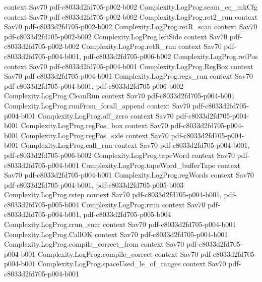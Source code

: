 \begin{theorem}
  {context}
  {Sav70}
  {pdf-c8033d2fd705-p002-b002}
\proofstep
  {Complexity.LogProg.seam_eq_mkCfg}
  {context}
  {Sav70}
  {pdf-c8033d2fd705-p002-b002}
\proofstep
  {Complexity.LogProg.ret2_run}
  {context}
  {Sav70}
  {pdf-c8033d2fd705-p002-b002}
\proofstep
  {Complexity.LogProg.retR_scan}
  {context}
  {Sav70}
  {pdf-c8033d2fd705-p002-b002}
\proofstep
  {Complexity.LogProg.leftSide}
  {context}
  {Sav70}
  {pdf-c8033d2fd705-p002-b002}
\proofstep
  {Complexity.LogProg.retR_run}
  {context}
  {Sav70}
  {pdf-c8033d2fd705-p004-b001,
    pdf-c8033d2fd705-p006-b002}
\proofstep
  {Complexity.LogProg.retPos}
  {context}
  {Sav70}
  {pdf-c8033d2fd705-p004-b001}
\proofstep
  {Complexity.LogProg.RegBox}
  {context}
  {Sav70}
  {pdf-c8033d2fd705-p004-b001}
\proofstep
  {Complexity.LogProg.regs_run}
  {context}
  {Sav70}
  {pdf-c8033d2fd705-p004-b001,
    pdf-c8033d2fd705-p006-b002}
\proofstep
  {Complexity.LogProg.CleanRun}
  {context}
  {Sav70}
  {pdf-c8033d2fd705-p004-b001}
\proofstep
  {Complexity.LogProg.runFrom_forall_append}
  {context}
  {Sav70}
  {pdf-c8033d2fd705-p004-b001}
\proofstep
  {Complexity.LogProg.off_zero}
  {context}
  {Sav70}
  {pdf-c8033d2fd705-p004-b001}
\proofstep
  {Complexity.LogProg.regPos_box}
  {context}
  {Sav70}
  {pdf-c8033d2fd705-p004-b001}
\proofstep
  {Complexity.LogProg.regPos_side}
  {context}
  {Sav70}
  {pdf-c8033d2fd705-p004-b001}
\proofstep
  {Complexity.LogProg.call_run}
  {context}
  {Sav70}
  {pdf-c8033d2fd705-p004-b001,
    pdf-c8033d2fd705-p006-b002}
\proofstep
  {Complexity.LogProg.tapeWord}
  {context}
  {Sav70}
  {pdf-c8033d2fd705-p004-b001}
\proofstep
  {Complexity.LogProg.tapeWord_bufferTape}
  {context}
  {Sav70}
  {pdf-c8033d2fd705-p004-b001}
\proofstep
  {Complexity.LogProg.regWords}
  {context}
  {Sav70}
  {pdf-c8033d2fd705-p004-b001,
    pdf-c8033d2fd705-p005-b003}
\proofstep
  {Complexity.LogProg.rstep}
  {context}
  {Sav70}
  {pdf-c8033d2fd705-p004-b001,
    pdf-c8033d2fd705-p005-b004}
\proofstep
  {Complexity.LogProg.rrun}
  {context}
  {Sav70}
  {pdf-c8033d2fd705-p004-b001,
    pdf-c8033d2fd705-p005-b004}
\proofstep
  {Complexity.LogProg.rrun_succ}
  {context}
  {Sav70}
  {pdf-c8033d2fd705-p004-b001}
\proofstep
  {Complexity.LogProg.CallOK}
  {context}
  {Sav70}
  {pdf-c8033d2fd705-p004-b001}
\proofstep
  {Complexity.LogProg.compile_correct_from}
  {context}
  {Sav70}
  {pdf-c8033d2fd705-p004-b001}
\proofstep
  {Complexity.LogProg.compile_correct}
  {context}
  {Sav70}
  {pdf-c8033d2fd705-p004-b001}
\proofstep
  {Complexity.LogProg.spaceUsed_le_of_ranges}
  {context}
  {Sav70}
  {pdf-c8033d2fd705-p004-b001}

\end{theorem}
